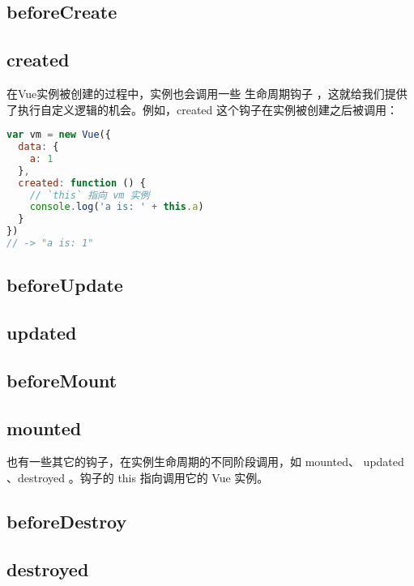 \subsection{beforeCreate}


\subsection{created}


在Vue实例被创建的过程中，实例也会调用一些 生命周期钩子 ，这就给我们提供了执行自定义逻辑的机会。例如，created 这个钩子在实例被创建之后被调用：

\begin{lstlisting}[language=JavaScript]
var vm = new Vue({
  data: {
    a: 1
  },
  created: function () {
    // `this` 指向 vm 实例
    console.log('a is: ' + this.a)
  }
})
// -> "a is: 1"
\end{lstlisting}


\subsection{beforeUpdate}


\subsection{updated}




\subsection{beforeMount}



\subsection{mounted}


也有一些其它的钩子，在实例生命周期的不同阶段调用，如 mounted、 updated 、destroyed 。钩子的 this 指向调用它的 Vue 实例。

\subsection{beforeDestroy}


\subsection{destroyed}



